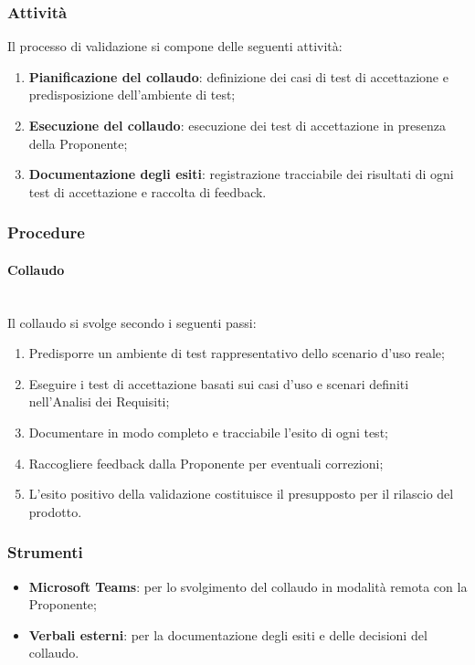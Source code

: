 \documentclass[10pt, letterpaper]{article}
\newcommand{\trisubsection}[1]{\paragraph{#1}\mbox{}\\}
\begin{document}
\subsubsection{Attività}
Il processo di validazione si compone delle seguenti attività:
\begin{enumerate}
    \item \textbf{Pianificazione del collaudo}: definizione dei casi di test di accettazione e predisposizione dell'ambiente di test;
    \item \textbf{Esecuzione del collaudo}: esecuzione dei test di accettazione in presenza della Proponente;
    \item \textbf{Documentazione degli esiti}: registrazione tracciabile dei risultati di ogni test di accettazione e raccolta di feedback.
\end{enumerate}

\subsubsection{Procedure}

\trisubsection{Collaudo}
Il collaudo si svolge secondo i seguenti passi:
\begin{enumerate}
    \item Predisporre un ambiente di test rappresentativo dello scenario d'uso reale;
    \item Eseguire i test di accettazione basati sui casi d'uso e scenari definiti nell'Analisi dei Requisiti;
    \item Documentare in modo completo e tracciabile l'esito di ogni test;
    \item Raccogliere feedback dalla Proponente per eventuali correzioni;
    \item L'esito positivo della validazione costituisce il presupposto per il rilascio del prodotto.
\end{enumerate}

\subsubsection{Strumenti}
\begin{itemize}
    \item \textbf{Microsoft Teams}: per lo svolgimento del collaudo in modalità remota con la Proponente;
    \item \textbf{Verbali esterni}: per la documentazione degli esiti e delle decisioni del collaudo.
\end{itemize}
\end{document}
